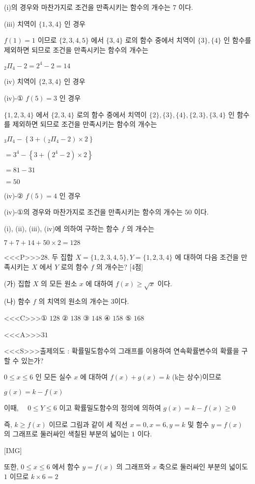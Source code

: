 \documentclass{oblivoir}
\begin{document}
(i)의 경우와 마찬가지로 조건을 만족시키는 함수의 개수는 $7$ 이다.

(iii) 치역이 $\{1,3,4\}$ 인 경우

$f(1)=1$ 이므로 $\{2,3,4,5\}$ 에서 $\{3,4\}$ 로의 함수 중에서 치역이 $\{3\},\{4\}$ 인 함수를
제외하면 되므로 조건을 만족시키는 함수의 개수는

${ }_{2} \Pi_{4}-2=2^{4}-2=14$

(iv) 치역이 $\{2,3,4\}$ 인 경우

(iv)-① $f(5)=3$ 인 경우

$\{1,2,3,4\}$ 에서 $\{2,3,4\}$ 로의 함수 중에서 치역이 $\{2\},\{3\},\{4\},\{2,3\},\{3,4\}$ 인 함수를 제외하면 되므로 조건을 만족시키는 함수의 개수는

${ }_{3} \Pi_{4}-\left\{3+\left({ }_{2} \Pi_{4}-2\right) \times 2\right\}$

$=3^{4}-\left\{3+\left(2^{4}-2\right) \times 2\right\}$

$=81-31$

$=50$

(iv)-② $f(5)=4$ 인 경우

(iv)-①의 경우와 마찬가지로 조건을 만족시키는 함수의 개수는 $50$ 이다.

(i), (ii), (iii), (iv)에 의하여 구하는 함수 $f$ 의 개수는

$7+7+14+50 \times 2=128$


<<<P>>>28. 두 집합 $X=\{1,2,3,4,5\}, Y=\{1,2,3,4\}$ 에 대하여 다음 조건을 만족시키는 $X$ 에서 $Y$ 로의 함수 $f$ 의 개수는? [4점]

(가) 집합 $X$ 의 모든 원소 $x$ 에 대하여 $f(x) \geq \sqrt{x}$ 이다.

(나) 함수 $f$ 의 치역의 원소의 개수는 $3$이다.

<<<C>>>① $128$
② $138$
③ $148$
④ $158$
⑤ $168$


<<<A>>>$31$

<<<S>>>출제의도 : 확률밀도함수의 그래프를 이용하여 연속확률변수의 확률을 구할 수 있는가?

$0 \leq x \leq 6$ 인 모든 실수 $x$ 에 대하여 $f(x)+g(x)=k$ (k는 상수)이므로

$g(x)=k-f(x)$

이때, $\quad 0 \leq Y \leq 6$ 이고 확률밀도함수의 정의에 의하여 $g(x)=k-f(x) \geq 0$

즉, $k \geq f(x)$ 이므로 그림과 같이 세 직선 $x=0, x=6, y=k$ 및 함수 $y=f(x)$ 의 그래프로 둘러싸인 색칠된 부분의 넓이는 $1$ 이다.

[IMG]

또한, $0 \leq x \leq 6$ 에서 함수 $y=f(x)$ 의 그래프와 $x$ 축으로 둘러싸인 부분의 넓이도 $1$ 이므로
$k \times 6=2$
\end{document}

